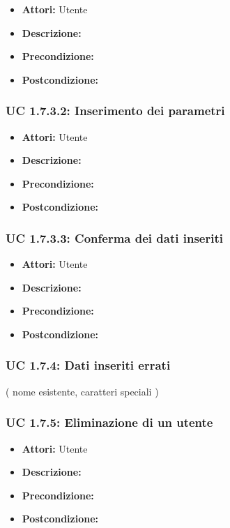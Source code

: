\begin{itemize}
\item \textbf{Attori:} Utente
\item \textbf{Descrizione:} 
\item \textbf{Precondizione:} 
\item \textbf{Postcondizione:} 
\end{itemize}

\subsubsection{UC 1.7.3.2: Inserimento dei parametri}

\begin{itemize}
\item \textbf{Attori:} Utente
\item \textbf{Descrizione:} 
\item \textbf{Precondizione:} 
\item \textbf{Postcondizione:} 
\end{itemize}

\subsubsection{UC 1.7.3.3: Conferma dei dati inseriti}

\begin{itemize}
\item \textbf{Attori:} Utente
\item \textbf{Descrizione:} 
\item \textbf{Precondizione:} 
\item \textbf{Postcondizione:} 
\end{itemize}

\subsubsection{UC 1.7.4: Dati inseriti errati}
( nome esistente, caratteri speciali )
\subsubsection{UC 1.7.5: Eliminazione di un utente}

\begin{itemize}
\item \textbf{Attori:} Utente
\item \textbf{Descrizione:} 
\item \textbf{Precondizione:} 
\item \textbf{Postcondizione:} 
\end{itemize}

